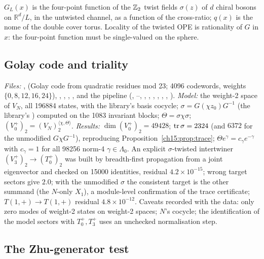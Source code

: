 \begin{physics}
$G_L(x)$ is the four-point function of the ${\mathbb{Z}}_2$ twist fields $\sigma(z)$ of $d$ chiral bosons
on $\mathbb{R}^d/L$, in the untwisted channel, as a function of the cross-ratio; $q(x)$ is the nome of the
double cover torus. Locality of the twisted OPE is rationality of $G$ in $x$: the four-point
function must be single-valued on the sphere.
\end{physics}

\subsection{Golay code and triality}\label{ch15:sec:num-triality}

\emph{Files:} ,  (Golay code from quadratic residues mod 23;
4096 codewords, weights $\{0,8,12,16,24\}$), , , ,
, and the pipeline  (, --,
, , , , , ,
). \emph{Model:} the weight-2 space of $V_N$, all 196884 states, with the library's
basis cocycle; $\sigma=G(\chi z_0)G^{-1}$ (the library's ) computed on the 1083
invariant blocks; $\Theta=\sigma\chi\sigma$; $(V_0^+)_2=(V_N)_2^{\langle\chi,\Theta\rangle}$. \emph{Results:}
$\dim(V_0^+)_2=49428$; $\operatorname{tr}\sigma=2324$ (and $6372$ for the unmodified $G\chi G^{-1}$),
reproducing Proposition~\ref{ch15:prop:trace}; $\Theta e^\gamma=c_\gamma e^{-\gamma}$ with $c_\gamma=1$ for
all 98256 norm-4 $\gamma\in\Lambda_0$. An explicit $\sigma$-twisted intertwiner $(V_3^+)_2\to(T_0^+)_2$
was built by breadth-first propagation from a joint eigenvector and checked on 15000 identities,
residual $4.2\times10^{-15}$; wrong target sectors give $2.0$; with the unmodified $\sigma$ the
consistent target is the other summand (the $N$-only $X_1$), a module-level confirmation of the
trace certificate; $T(1,+)\to T(1,+)$ residual $4.8\times10^{-12}$. Caveats recorded with the data:
only zero modes of weight-2 states on weight-2 spaces; $N$'s cocycle; the identification of the model
sectors with $T_0^+,T_3^+$ uses an unchecked normalisation step.

\subsection{The Zhu-generator test}\label{ch15:sec:num-zhu}

